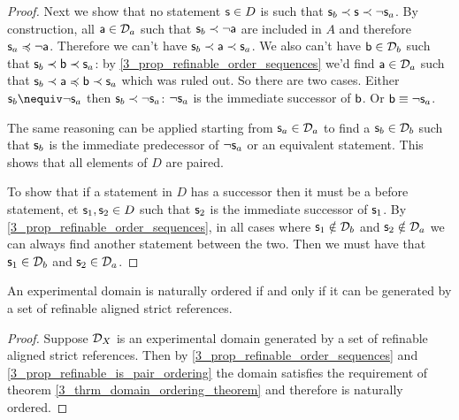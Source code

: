 \documentclass[11pt,letterpaper,fleqn]{memoir} %
\begin{document}
\begin{mathSection}
\begin{proof}
	Next we show that no statement $\stmt \in D$ is such that $\stmt_b \snarrower \stmt \snarrower \NOT \stmt_a$. By construction, all $\stmt[a] \in \edomain_a$ such that $\stmt_b \snarrower \NOT \stmt[a]$ are included in $A$ and therefore $\stmt_a \narrower \NOT \stmt[a]$. Therefore we can't have $\stmt_b \snarrower \stmt[a] \snarrower \stmt_a$. We also can't have $\stmt[b] \in \edomain_b$ such that $\stmt_b \snarrower \stmt[b] \snarrower \stmt_a$: by \ref{3_prop_refinable_order_sequences} we'd find $\stmt[a] \in \edomain_a$ such that $\stmt_b \snarrower \stmt[a] \narrower \stmt[b] \snarrower \stmt_a$ which was ruled out. So there are two cases. Either $\stmt_b \nequiv \NOT \stmt_a$ then $\stmt_b \snarrower \NOT \stmt_a$: $\NOT \stmt_a$ is the immediate successor of $\stmt[b]$. Or $\stmt[b] \equiv \NOT \stmt_a$.
	
	The same reasoning can be applied starting from $\stmt_a \in \edomain_a$ to find a $\stmt_b \in \edomain_b$ such that $\stmt_b$ is the immediate predecessor of $\NOT \stmt_a$ or an equivalent statement. This shows that all elements of $D$ are paired.
	
	To show that if a statement in $D$ has a successor then it must be a before statement, et $\stmt_1, \stmt_2 \in D$ such that $\stmt_2$ is the immediate successor of $\stmt_1$. By \ref{3_prop_refinable_order_sequences}, in all cases where $\stmt_1 \notin \edomain_b$ and $\stmt_2 \notin \edomain_a$ we can always find another statement between the two. Then we must have that $\stmt_1 \in \edomain_b$ and $\stmt_2 \in \edomain_a$.
\end{proof}

\begin{thrm}\label{3_thrm_reference_ordering}
	An experimental domain is naturally ordered if and only if it can be generated by a set of refinable aligned strict references.
\end{thrm}
\begin{proof}
	Suppose $\edomain_X$ is an experimental domain generated by a set of refinable aligned strict references. Then by \ref{3_prop_refinable_order_sequences} and \ref{3_prop_refinable_is_pair_ordering} the domain satisfies the requirement of theorem \ref{3_thrm_domain_ordering_theorem} and therefore is naturally ordered.
	

\end{proof}
\end{mathSection}
\end{document}
